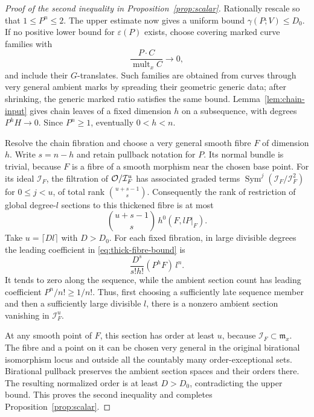 \begin{proof}[Proof of the second inequality in Proposition~\ref{prop:scalar}]
Rationally rescale so that $1\le P^n\le2$.  The upper estimate
now gives a uniform bound $\gamma(P;V)\le D_0$.  If no positive
lower bound for $\varepsilon(P)$ exists, choose covering marked
curve families with
\[
                   \frac{P\cdot C}{\operatorname{mult}_x C}
                         \longrightarrow0,
\]
and include their $G$-translates.  Such families are obtained from
curves through very general ambient marks by spreading their
geometric generic data; after shrinking, the generic marked
ratio satisfies the same bound.  Lemma~\ref{lem:chain-input}
gives chain leaves of a fixed dimension $h$ on a subsequence,
with degrees $P^hH\to0$.  Since $P^n\ge1$, eventually
$0<h<n$.

Resolve the chain fibration and choose a very general smooth
fibre $F$ of dimension $h$.  Write $s=n-h$ and retain pullback
notation for $P$.  Its normal bundle is trivial, because $F$
is a fibre of a smooth morphism near the chosen base point.
For its ideal $\mathcal I_F$, the filtration of
$\mathcal O/\mathcal I_F^u$ has associated graded terms
$\operatorname{Sym}^j(\mathcal I_F/\mathcal I_F^2)$ for
$0\le j<u$, of total rank $\binom{u+s-1}{s}$.  Consequently
the rank of restriction of global degree-$l$ sections to this
thickened fibre is at most
\begin{equation}\label{eq:thick-fibre-bound}
                      \binom{u+s-1}{s}\,h^0(F,lP|_F).
\end{equation}
Take $u=\lceil Dl\rceil$ with $D>D_0$.  For each fixed
fibration, in large divisible degrees the leading coefficient
in \eqref{eq:thick-fibre-bound} is
\[
                    \frac{D^s}{s!h!}(P^hF)\,l^n.
\]
It tends to zero along the sequence, while the ambient section
count has leading coefficient $P^n/n!\ge1/n!$.  Thus, first
choosing a sufficiently late sequence member and then a
sufficiently large divisible $l$, there is a nonzero ambient
section vanishing in $\mathcal I_F^u$.

At any smooth point of $F$, this section has order at least $u$,
because $\mathcal I_F\subset\mathfrak m_x$.  The fibre and a
point on it can be chosen very general in the original
birational isomorphism locus and outside all the countably many
order-exceptional sets.  Birational pullback preserves the
ambient section spaces and their orders there.  The resulting
normalized order is at least $D>D_0$, contradicting the upper
bound.  This proves the second inequality and completes
Proposition~\ref{prop:scalar}.
\end{proof}
